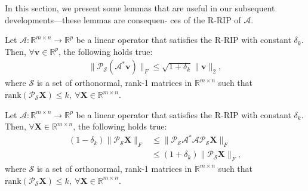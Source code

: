 \documentclass[twocolumn]{svjour3}
\newcommand{\vectornormbig}[1]{\big\|#1\big\|}
\newcommand{\sensing}{\boldsymbol{\mathcal{A}}}
\newcommand{\signal}{\boldsymbol{X}}
\newcommand{\dimension}{m \times n}
\newcommand{\numsam}{p}
\newcommand{\rank}{k}
\begin{document}
In this section, we present some lemmas that are useful in our subsequent developments---these lemmas are consequen- ces of the R-RIP of $ \sensing $.

\begin{lemma}{\label{lemma:1}}\cite{admira2010}
Let $ \sensing: \mathbb{R}^{\dimension} \rightarrow \mathbb{R}^{\numsam} $ be a linear operator that satisfies the R-RIP with constant $ \delta_{\rank} $. Then, $ \forall \boldsymbol{v} \in \mathbb{R}^{\numsam} $, the following holds true:
\begin{align}
\vectornormbig{\mathcal{P}_{\mathcal{S}}(\sensing^\ast \boldsymbol{v})}_F \leq \sqrt{1 + \delta_{\rank}}\vectornormbig{\boldsymbol{v}}_2, \label{eq:prel:00}
\end{align} where $ \mathcal{S} $ is a set of orthonormal, rank-1 matrices in $\mathbb{R}^{\dimension}$ such that $ \text{rank}(\mathcal{P}_{\mathcal{S}}\signal) \leq \rank, ~\forall \signal \in \mathbb{R}^{\dimension} $.
\end{lemma}

\begin{lemma}{\label{lemma:2}}\cite{admira2010}
Let $ \sensing: \mathbb{R}^{\dimension} \rightarrow \mathbb{R}^{\numsam} $ be a linear operator that satisfies the R-RIP with constant $ \delta_{\rank} $. Then, $ \forall \signal \in \mathbb{R}^{\dimension} $, the following holds true:
\begin{align}
(1-\delta_{\rank})\vectornormbig{\mathcal{P}_{\mathcal{S}}\signal}_F &\leq \vectornormbig{\mathcal{P}_{\mathcal{S}}\sensing^\ast \sensing \mathcal{P}_{\mathcal{S}}\signal}_F \nonumber \\ &\leq (1+\delta_{\rank})\vectornormbig{\mathcal{P}_{\mathcal{S}}\signal}_F, \label{eq:prel:01}
\end{align} where $ \mathcal{S} $ is a set of orthonormal, rank-1 matrices in $\mathbb{R}^{\dimension}$ such that $ \text{rank}(\mathcal{P}_{\mathcal{S}}\signal) \leq \rank, ~\forall \signal \in \mathbb{R}^{\dimension} $.
\end{lemma}
\end{document}

